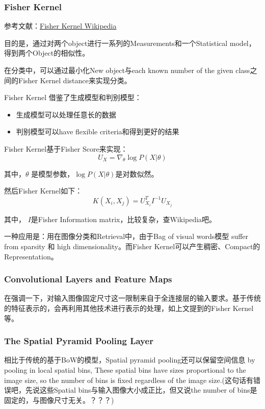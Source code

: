 \subsubsection{Fisher Kernel}

参考文献：\href{https://en.wikipedia.org/wiki/Fisher_kernel}{Fisher Kernel Wikipedia}

目的是，通过对两个object进行一系列的Measurements和一个Statistical model， 得到两个Object的相似性。

在分类中，可以通过最小化New object与each known number of the given class之间的Fisher Kernel distance来实现分类。

Fisher Kernel 借鉴了生成模型和判别模型：
\begin{itemize}
\item 生成模型可以处理任意长的数据
\item 判别模型可以have flexible criteria和得到更好的结果
\end{itemize}

Fisher Kernel基于Fisher Score来实现：
\begin{displaymath}
U_X = \nabla_\theta \log P(X | \theta)
\end{displaymath}

其中，$\theta$ 是模型参数，$\log P(X|\theta)$是对数似然。

然后Fisher Kernel如下：
\begin{displaymath}
K(X_i, X_j) = U_{X_i}^TI^{-1}U_{X_j}
\end{displaymath}

其中， $I$是Fisher Information matrix，比较复杂，查Wikipedia吧。

一种应用是：用在图像分类和Retrieval中，由于Bag of visual words模型 suffer from sparsity 和 high dimensionality。而Fisher Kernel可以产生稠密、Compact的Representation。

\subsubsection{Convolutional Layers and Feature Maps}

在强调一下，对输入图像固定尺寸这一限制来自于全连接层的输入要求。基于传统的特征表示的，会再利用其他技术进行表示的处理，如上文提到的Fisher Kernel等。

\subsubsection{The Spatial Pyramid Pooling Layer}

相比于传统的基于BoW的模型，Spatial pyramid pooling还可以保留空间信息 by pooling in local spatial bins, These spatial bins have sizes proportional to the image size, so the number of bins is fixed regardless of the image size.(这句话有错误吧，先说这些Spatial bins与输入图像大小成正比，但又说the number of bins是固定的，与图像尺寸无关。？？？)

